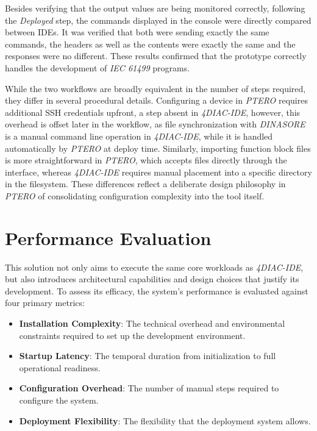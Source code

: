 Besides verifying that the output values are being monitored correctly, following the \textit{Deployed} step, the commands displayed in the console were directly compared between \acp{IDE}. It was verified that both were sending exactly the same commands, the headers as well as the contents were exactly the same and the responses were no different. These results confirmed that the prototype correctly handles the development of \textit{IEC 61499} programs.

While the two workflows are broadly equivalent in the number of steps required, they differ in several procedural details. Configuring a device in \textit{PTERO} requires additional SSH credentials upfront, a step absent in \textit{4DIAC-IDE}, however, this overhead is offset later in the workflow, as file synchronization with \textit{DINASORE} is a manual command line operation in \textit{4DIAC-IDE}, while it is handled automatically by \textit{PTERO} at deploy time. Similarly, importing function block files is more straightforward in \textit{PTERO}, which accepts files directly through the interface, whereas \textit{4DIAC-IDE} requires manual placement into a specific directory in the filesystem. These differences reflect a deliberate design philosophy in \textit{PTERO} of consolidating configuration complexity into the tool itself.

\section{Performance Evaluation}
This solution not only aims to execute the same core workloads as \textit{4DIAC-IDE}, but also introduces architectural capabilities and design choices that justify its development. To assess its efficacy, the system's performance is evaluated against four primary metrics:

\begin{itemize}
    \item \textbf{Installation Complexity}: The technical overhead and environmental constraints required to set up the development environment.
    \item \textbf{Startup Latency}: The temporal duration from initialization to full operational readiness.
    \item \textbf{Configuration Overhead}: The number of manual steps required to configure the system.
    \item \textbf{Deployment Flexibility}: The flexibility that the deployment system allows.
\end{itemize}

